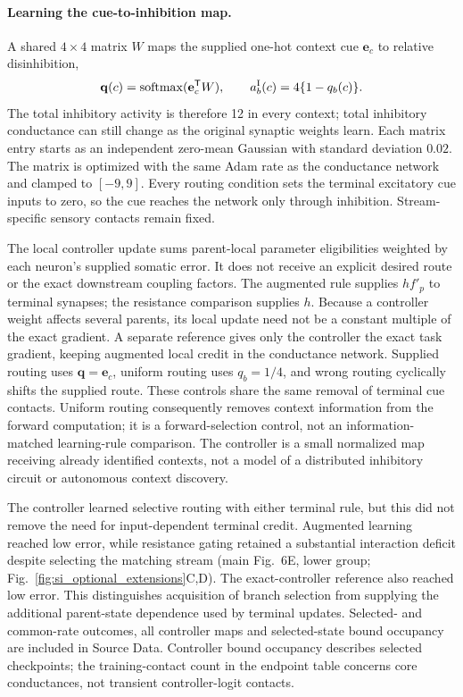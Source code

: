 \paragraph{Learning the cue-to-inhibition map.}
A shared $4\times4$ matrix $W$ maps the supplied one-hot context cue $\mathbf e_c$ to relative disinhibition,
\[
\mathbf q(c)=\operatorname{softmax}(\mathbf e_c^{\mathsf T}W),
\qquad a_b^{\rm I}(c)=4\{1-q_b(c)\}.
\]
The total inhibitory activity is therefore 12 in every context; total inhibitory conductance can still change as the original synaptic weights learn. Each matrix entry starts as an independent zero-mean Gaussian with standard deviation $0.02$. The matrix is optimized with the same Adam rate as the conductance network and clamped to $[-9,9]$. Every routing condition sets the terminal excitatory cue inputs to zero, so the cue reaches the network only through inhibition. Stream-specific sensory contacts remain fixed.

The local controller update sums parent-local parameter eligibilities weighted by each neuron's supplied somatic error. It does not receive an explicit desired route or the exact downstream coupling factors. The augmented rule supplies $h f'_p$ to terminal synapses; the resistance comparison supplies $h$. Because a controller weight affects several parents, its local update need not be a constant multiple of the exact gradient. A separate reference gives only the controller the exact task gradient, keeping augmented local credit in the conductance network. Supplied routing uses $\mathbf q=\mathbf e_c$, uniform routing uses $q_b=1/4$, and wrong routing cyclically shifts the supplied route. These controls share the same removal of terminal cue contacts. Uniform routing consequently removes context information from the forward computation; it is a forward-selection control, not an information-matched learning-rule comparison. The controller is a small normalized map receiving already identified contexts, not a model of a distributed inhibitory circuit or autonomous context discovery.

The controller learned selective routing with either terminal rule, but this did not remove the need for input-dependent terminal credit. Augmented learning reached low error, while resistance gating retained a substantial interaction deficit despite selecting the matching stream (main Fig.~6E, lower group; Fig.~\ref{fig:si_optional_extensions}C,D). The exact-controller reference also reached low error. This distinguishes acquisition of branch selection from supplying the additional parent-state dependence used by terminal updates. Selected- and common-rate outcomes, all controller maps and selected-state bound occupancy are included in Source Data. Controller bound occupancy describes selected checkpoints; the training-contact count in the endpoint table concerns core conductances, not transient controller-logit contacts.


